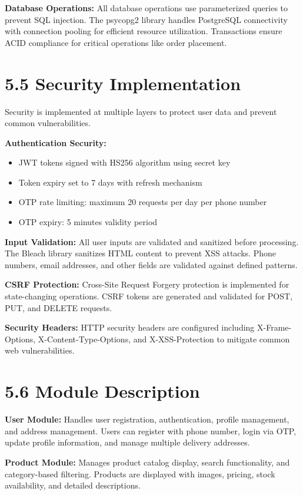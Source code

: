 \documentclass[12pt,a4paper]{report}
\begin{document}
\textbf{Database Operations:}
All database operations use parameterized queries to prevent SQL injection. The psycopg2 library handles PostgreSQL connectivity with connection pooling for efficient resource utilization. Transactions ensure ACID compliance for critical operations like order placement.

\section*{5.5 Security Implementation}

Security is implemented at multiple layers to protect user data and prevent common vulnerabilities.

\textbf{Authentication Security:}
\begin{itemize}
    \item JWT tokens signed with HS256 algorithm using secret key
    \item Token expiry set to 7 days with refresh mechanism
    \item OTP rate limiting: maximum 20 requests per day per phone number
    \item OTP expiry: 5 minutes validity period
\end{itemize}

\textbf{Input Validation:}
All user inputs are validated and sanitized before processing. The Bleach library sanitizes HTML content to prevent XSS attacks. Phone numbers, email addresses, and other fields are validated against defined patterns.

\textbf{CSRF Protection:}
Cross-Site Request Forgery protection is implemented for state-changing operations. CSRF tokens are generated and validated for POST, PUT, and DELETE requests.

\textbf{Security Headers:}
HTTP security headers are configured including X-Frame-Options, X-Content-Type-Options, and X-XSS-Protection to mitigate common web vulnerabilities.

\section*{5.6 Module Description}

\textbf{User Module:}
Handles user registration, authentication, profile management, and address management. Users can register with phone number, login via OTP, update profile information, and manage multiple delivery addresses.

\textbf{Product Module:}
Manages product catalog display, search functionality, and category-based filtering. Products are displayed with images, pricing, stock availability, and detailed descriptions.
\end{document}
